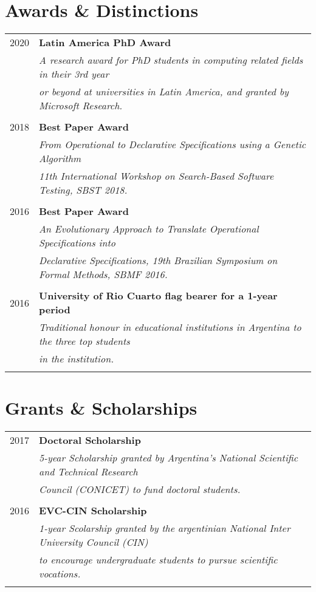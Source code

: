 \documentclass[a4paper,10pt]{article} %
\begin{document}
\section{Awards \& Distinctions}
\begin{longtable}{rl}
\\
\textsc{2020} & \textbf{Latin America PhD Award} \\
& \textit{A research award for PhD students in computing related fields in their 3rd year} \\
& \textit{or beyond at universities in Latin America, and granted by Microsoft Research.} \\ & \\

\textsc{2018} & \textbf{Best Paper Award} \\ 
& \textit{From Operational to Declarative Specifications using a Genetic Algorithm} \\
& \textit{11th International Workshop on Search-Based Software Testing, SBST 2018.} \\ & \\

\textsc{2016} & \textbf{Best Paper Award} \\ 
& \textit{An Evolutionary Approach to Translate Operational Specifications into } \\
& \textit{Declarative Specifications, 19th Brazilian Symposium on Formal Methods, SBMF 2016.} \\ & \\

\textsc{2016} & \textbf{University of Rio Cuarto flag bearer for a 1-year period} \\ 
& \textit{Traditional honour in educational institutions in Argentina to the three top students} \\ 
& \textit{in the institution.} \\ & \\
\end{longtable}

\section{Grants \& Scholarships}
\begin{tabular}{rl}
\\
\textsc{2017} & \textbf{Doctoral Scholarship} \\ 
& \textit{5-year Scholarship granted by Argentina's National Scientific and Technical Research} \\
& \textit{Council (CONICET) to fund doctoral students.} \\ & \\

\textsc{2016} & \textbf{EVC-CIN Scholarship} \\ 
& \textit{1-year Scolarship granted by the argentinian National Inter University Council (CIN)} \\
& \textit{to encourage undergraduate students to pursue scientific vocations.} \\ & \\

\end{tabular}
\end{document}
